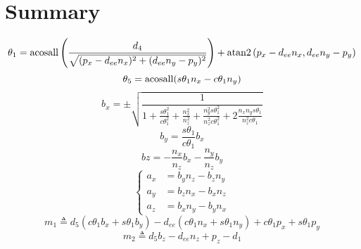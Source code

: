 \documentclass[utf8]{article}
\begin{document}
\section{Summary}
\begin{equation*}
\theta_1 = {\rm acosall}\left(\frac{d_4}{\sqrt{(p_x - d_{ee}n_x)^2 + (d_{ee}n_y - p_y)^2}}\right) + {\rm atan2}\left(p_x - d_{ee}n_x, d_{ee}n_y - p_y\right)
\end{equation*}
\begin{equation*}
\theta_5 = {\rm acosall}(s\theta_1n_x - c\theta_1 n_y)
\end{equation*}
\begin{equation*}
b_x =\pm \sqrt{\frac{1}{1 + \frac{s\theta_1^2}{c\theta_1^2} + \frac{n_x^2}{n_z^2} + \frac{n_y^2s\theta_1^2}{n_z^2c\theta_1^2} + 2\frac{n_xn_ys\theta_1}{n_z^2c\theta_1}}}
\end{equation*}
\begin{equation*}
b_y = \frac{s\theta_1}{c\theta_1}b_x
\end{equation*}
\begin{equation*}
bz = -\frac{n_x}{n_z}b_x - \frac{n_y}{n_z}b_y
\end{equation*}
\begin{equation*}
\left\{
\begin{aligned}
a_x &= b_yn_z - b_zn_y\\
a_y &= b_zn_x - b_xn_z\\
a_z &= b_xn_y - b_yn_x
\end{aligned}
\right.
\end{equation*}
\begin{equation*}
m_1 \triangleq d_5(c\theta_1b_x + s\theta_1b_y) - d_{ee}(c\theta_1n_x + s\theta_1n_y) + c\theta_1p_x + s\theta_1p_y
\end{equation*}
\begin{equation*}
m_2 \triangleq d_5b_z - d_{ee}n_z + p_z - d_1
\end{equation*}
\end{document}
